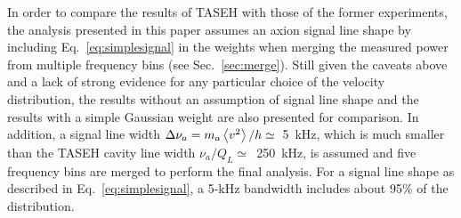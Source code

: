 In order to compare the results of TASEH with those of the former experiments, 
the analysis presented in this paper assumes an axion 
signal line shape by including Eq.~\eqref{eq:simplesignal} in the weights 
when merging the measured power from multiple frequency bins 
(see Sec.~\ref{sec:merge}). Still given the caveats above and a lack of 
strong evidence for any particular choice of the velocity distribution, 
the results without an assumption of signal line shape and the results 
with a simple Gaussian weight are also presented for comparison. 
In addition, a signal line width 
$\Delta\nu_a=m_a\left<v^2\right>/h\simeq$~5~kHz, which is much smaller than 
the TASEH cavity line width $\nu_a/Q_L\simeq$~250~kHz, is assumed and 
five frequency bins are merged to perform the final analysis. For a signal 
line shape as described in Eq.~\eqref{eq:simplesignal}, a 5-kHz bandwidth 
includes about 95\% of the distribution.


 
